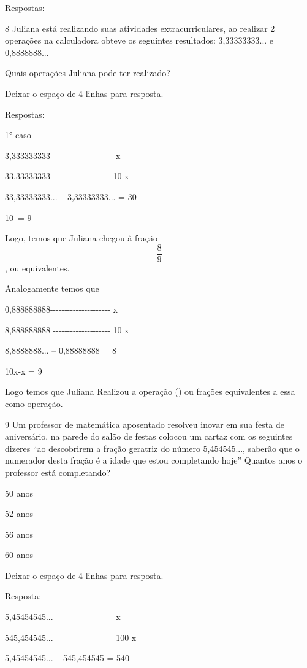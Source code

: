 Respostas:

\num{8} Juliana está realizando suas atividades extracurriculares, ao
realizar 2 operações na calculadora obteve os seguintes resultados:
3,33333333... e 0,8888888...

Quais operações Juliana pode ter realizado?

Deixar o espaço de 4 linhas para resposta.

Respostas:

1° caso

3,333333333
-\/-\/-\/-\/-\/-\/-\/-\/-\/-\/-\/-\/-\/-\/-\/-\/-\/-\/-\/-\/- x

33,33333333 -\/-\/-\/-\/-\/-\/-\/-\/-\/-\/-\/-\/-\/-\/-\/-\/-\/-\/-\/-
10 x

33,33333333... -- 3,33333333... = 30

10\times --\times = 9

Logo, temos que Juliana chegou à fração \[\frac{8}{9}\], ou
equivalentes.

Analogamente temos que

0,888888888-\/-\/-\/-\/-\/-\/-\/-\/-\/-\/-\/-\/-\/-\/-\/-\/-\/-\/-\/-\/-
x

8,888888888 -\/-\/-\/-\/-\/-\/-\/-\/-\/-\/-\/-\/-\/-\/-\/-\/-\/-\/-\/-
10 x

8,8888888... -- 0,88888888 = 8

10x-x = 9

Logo temos que Juliana Realizou a operação () ou frações
equivalentes a essa como operação.

\num{9} Um professor de matemática aposentado resolveu inovar em sua festa de
aniversário, na parede do salão de festas colocou um cartaz com os
seguintes dizeres ``ao descobrirem a fração geratriz do número
5,454545..., saberão que o numerador desta fração é a idade que estou
completando hoje'' Quantos anos o professor está completando?

\item 50 anos
\item 52 anos
\item 56 anos
\item 60 anos

Deixar o espaço de 4 linhas para resposta.

Resposta:

5,45454545...-\/-\/-\/-\/-\/-\/-\/-\/-\/-\/-\/-\/-\/-\/-\/-\/-\/-\/-\/-\/-
x

545,454545... -\/-\/-\/-\/-\/-\/-\/-\/-\/-\/-\/-\/-\/-\/-\/-\/-\/-\/-\/-
100 x

5,45454545... -- 545,454545 = 540

